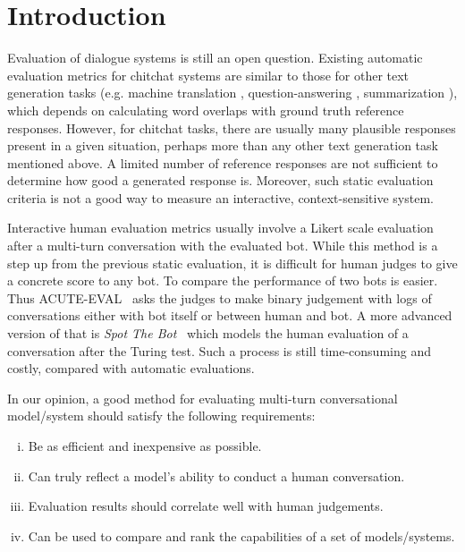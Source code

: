 \section{Introduction}
\label{sec:intro}

Evaluation of dialogue systems is still an open question. Existing
automatic evaluation metrics for chitchat systems are similar to those for 
other text generation tasks (e.g. machine translation \citep{papineni-etal-2002-bleu}, question-answering \citep{rajpurkar-etal-2016-squad}, 
summarization \citep{lin-2004-rouge}), which depends on calculating word overlaps with 
ground truth reference responses. 
However, for chitchat tasks, there are usually 
many plausible responses present in a given situation, 
perhaps more than any other text generation task mentioned above. 
A limited number of reference responses are 
not sufficient to determine how good a generated response is. 
Moreover, such static evaluation criteria is not a good way 
to measure an interactive, context-sensitive system.

Interactive human evaluation metrics usually 
involve a Likert scale evaluation after a multi-turn conversation 
with the evaluated bot. 
While this method is a step up from the previous static evaluation, 
it is difficult for human judges to give a concrete score to
any bot.
To compare the performance of two bots is easier. 
Thus ACUTE-EVAL~\citep{DBLP:journals/corr/abs-1909-03087} asks the 
judges to make binary judgement with logs of conversations either with bot itself or between human and bot. A more advanced version of that
is \textit{Spot The Bot}~\cite{deriu-etal-2020-spot} which models the 
human evaluation of a 
conversation after the Turing test. Such a process is still 
time-consuming and costly, 
compared with automatic evaluations.

In our opinion, a good method for evaluating multi-turn conversational model/system 
should satisfy the following requirements:
\begin{enumerate}[(i)]
\item Be as efficient and inexpensive as possible.
\item Can truly reflect a model's ability to conduct a human conversation. 
\item Evaluation results should correlate well with human judgements.
\item Can be used to compare and rank the capabilities of a set of models/systems.
\end{enumerate}
  
